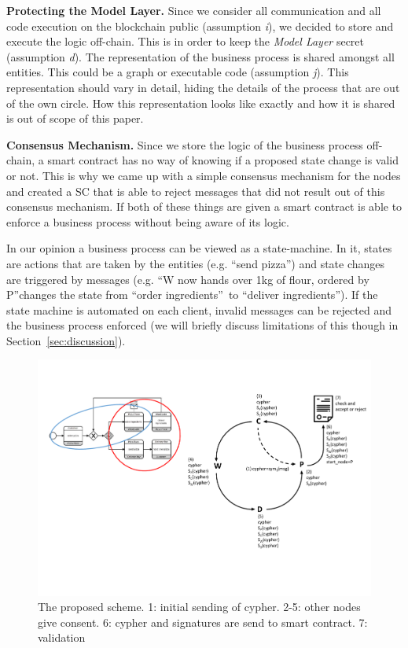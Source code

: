 \documentclass[runningheads]{llncs}
\newcommand{\ber}[1]{\textit{#1}}
\newcommand{\refsec}[1]{Section~\ref{#1}}
\renewcommand{\bigbreak}{}
\newcommand{\quotel}{``}
\newcommand{\quoter}{''}
\begin{document}
\bigbreak
\textbf{Protecting the Model Layer.} Since we consider all communication and all code execution on the blockchain public (assumption \ber{i}), we decided to store and execute the logic off-chain. This is in order to keep the \ber{Model Layer} secret (assumption \ber{d}). The representation of the business process is shared amongst all entities. This could be a graph or executable code (assumption \ber{j}). This representation should vary in detail, hiding the details of the process that are out of the own circle. How this representation looks like exactly and how it is shared is out of scope of this paper.


\bigbreak
\textbf{Consensus Mechanism.} Since we store the logic of the business process off-chain, a smart contract has no way of knowing if a proposed state change is valid or not. This is why we came up with a simple consensus mechanism for the nodes and created a SC that is able to reject messages that did not result out of this consensus mechanism. If both of these things are given a smart contract is able to enforce a business process without being aware of its logic. 

In our opinion a business process can be viewed as a state-machine. In it, states are actions that are taken by the entities (e.g. \quotel send pizza\quoter ) and state changes are triggered by messages (e.g. \quotel W now hands over 1kg of flour, ordered by P\quoter  changes the state from \quotel order ingredients\quoter \  to \quotel deliver ingredients\quoter ). If the state machine is automated on each client, invalid messages can be rejected and the business process enforced (we will briefly discuss limitations of this though in \refsec{sec:discussion}).

\begin{center}
\begin{figure}
    \centering
    \includegraphics[trim=13cm 4cm 0cm 3cm,clip=true,scale=0.5]{schema.pdf}
    \caption{The proposed scheme. 1: initial sending of cypher. 2-5: other nodes give consent. 6: cypher and signatures are send to smart contract. 7: validation} 
    \label{fig:scheme}
\end{figure}
\end{center}
\end{document}

